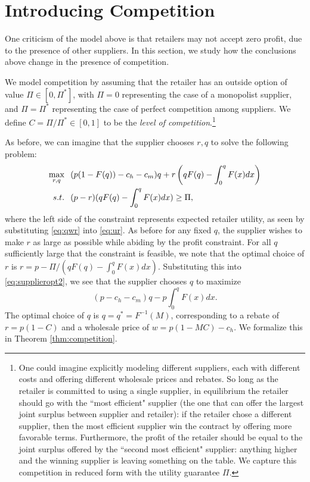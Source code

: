 \documentclass[11pt, oneside,margin=1in]{article}   	%
\begin{document}
\section{Introducing Competition}

One criticism of the model above is that retailers may not accept zero profit, due to the presence of other suppliers. In this section, we study how the conclusions above change in the presence of competition.

We model competition by assuming that the retailer has an outside option of value $\Pi \in [0,\Pi^*]$, with $\Pi = 0$ representing the case of a monopolist supplier, and $\Pi = \Pi^*$ representing the case of perfect competition among suppliers. We define $C = \Pi/\Pi^* \in [0,1]$ to be the {\em level of competition}.\footnote{One could imagine explicitly modeling different suppliers, each with different costs and offering different wholesale prices and rebates. So long as the retailer is committed to using a single supplier, in equilibrium the retailer should go with the ``most efficient" supplier (the one that can offer the largest joint surplus between supplier and retailer): if the retailer chose a different supplier, then the most efficient supplier win the contract by offering more favorable terms. Furthermore, the profit of the retailer should be equal to the joint surplus offered by the ``second most efficient" supplier: anything higher and the winning supplier is leaving something on the table. We capture this competition in reduced form with the utility guarantee $\Pi$.}

As before, we can imagine that the supplier chooses $r, q$ to solve the following problem:
\begin{align}
 \max_{r,q} & \hspace{.1 in} (p(1 - F(q)) - c_h - c_m)q + r\left(q F(q) -  \int_0^q F(x) dx\right) \label{eq:supplieropt2} \\
s.t. & \hspace{.1 in} (p-r)(qF(q) - \int_0^q F(x) dx) \geq \Pi, \nonumber
\end{align}
where the left side of the constraint represents expected retailer utility, as seen by substituting \eqref{eq:qwr} into \eqref{eq:ur}. As before for any fixed $q$, the supplier wishes to make $r$ as large as possible while abiding by the profit constraint. For all $q$ sufficiently large that the constraint is feasible, we note that the optimal choice of $r$ is $r = p - \Pi/(qF(q) - \int_0^q F(x) dx)$. Substituting this into \eqref{eq:supplieropt2}, we see that the supplier chooses $q$ to maximize 
\[ (p - c_h - c_m)q - p \int_0^q F(x)dx. \]
The optimal choice of $q$ is $q = q^* = F^{-1}(M)$, corresponding to a rebate of $r = p(1 - C)$ and a wholesale price of $w = p(1 - MC) - c_h$. We formalize this in Theorem \ref{thm:competition}.
\end{document}
